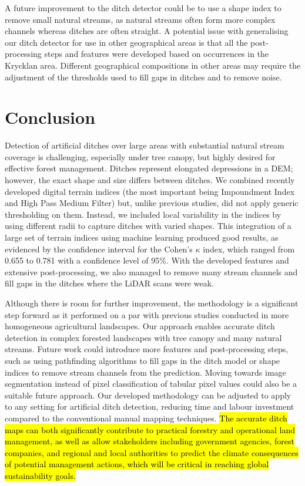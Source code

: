 \documentclass[11pt, review]{elsarticle} %
\begin{document}
A future improvement to the ditch detector could be to use a shape index to remove small natural streams, as natural streams often form more complex channels whereas ditches are often straight. A potential issue with generalising our ditch detector for use in other geographical areas is that all the post-processing steps and features were developed based on occurrences in the Krycklan area. Different geographical compositions in other areas may require the adjustment of the thresholds used to fill gaps in ditches and to remove noise.

\section{Conclusion}

Detection of artificial ditches over large areas with substantial natural stream coverage is challenging, especially under tree canopy, but highly desired for effective forest management. Ditches represent elongated depressions in a DEM; however, the exact shape and size differs between ditches. We combined recently developed digital terrain indices (the most important being Impoundment Index and High Pass Medium Filter) but, unlike previous studies, did not apply generic thresholding on them. Instead, we included local variability in the indices by using different radii to capture ditches with varied shapes. This integration of a large set of terrain indices using machine learning produced good results, as evidenced by the confidence interval for the Cohen's $\kappa$ index, which ranged from 0.655 to 0.781 with a confidence level of 95\%. With the developed features and extensive post-processing, we also managed to remove many stream channels and fill gaps in the ditches where the LiDAR scans were weak. 

Although there is room for further improvement, the methodology is a significant step forward as it performed on a par with previous studies conducted in more homogeneous agricultural landscapes. Our approach enables accurate ditch detection in complex forested landscapes with tree canopy and many natural streams. Future work could introduce more features and post-processing steps, such as using pathfinding algorithms to fill gaps in the ditch model or shape indices to remove stream channels from the prediction. Moving towards image segmentation instead of pixel classification of tabular pixel values could also be a suitable future approach. Our developed methodology can be adjusted to apply to any setting for artificial ditch detection, reducing time and labour investment compared to the conventional manual mapping techniques. \hl{The accurate ditch maps can both significantly contribute to practical forestry and operational land management, as well as allow stakeholders including government agencies, forest companies, and regional and local authorities to predict the climate consequences of potential management actions, which will be critical in reaching global sustainability goals.}
\end{document}
